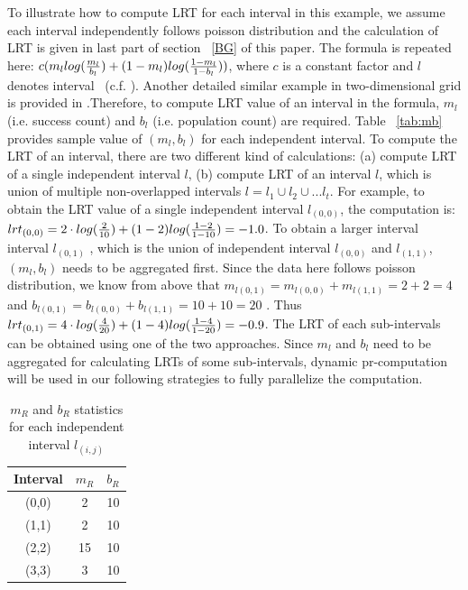 \documentclass[AMA,LATO1COL]{WileyNJD-v2}
\begin{document}
To illustrate how to compute LRT for each interval in this example, we assume each interval independently follows poisson distribution and the calculation of LRT is given in last part of section ~\ref{BG} of this paper. The formula is repeated here: $c(m_l log ({m_l\over {b_l}})+ (1-m_l)log({{1-m_l}\over {1-b_l}}))$, where $c$ is a constant factor and $l$ denotes interval ~(c.f. \cite{DagMaxmize}). Another detailed similar example in two-dimensional grid is provided in \cite{dke}.Therefore, to compute LRT value of an interval in the formula, $m_l$ (i.e. success count) and $b_l$ (i.e. population count) are required. Table ~\ref{tab:mb} provides sample value of $(m_l,b_l)$ for each independent interval. To compute the LRT of an interval, there are two different kind of calculations: (a) compute LRT of a single independent interval $l$, (b) compute LRT of an interval $l$, which is union of multiple non-overlapped intervals $l=l_1\cup l_2\cup...l_t$. For example, to obtain the LRT value of a single independent interval $l_{(0,0)}$, the computation is: $lrt_{(0,0)}=2\cdot log({2\over 10})+(1-2)log({{1-2}\over {1-10}})=-1.0$.  To obtain a larger interval interval  $l_{(0,1)}$ , which is the union of independent interval $l_{(0,0)}$ and $l_{(1,1)}$,  $(m_l, b_l)$ needs to be aggregated first. Since the data here follows poisson distribution, we know from above that $m_{l(0,1)}=m_{l(0,0)}+m_{l(1,1)}=2+2=4$ and $b_{l(0,1)}=b_{l(0,0)}+b_{l(1,1)}=10+10=20$ . Thus $lrt_{(0,1)}=4\cdot log({4\over 20})+(1-4)log({{1-4}\over {1-20}})=-0.9$. The LRT of each sub-intervals can be obtained using one of the two approaches. Since $m_l$ and $b_l$ need to be aggregated for calculating LRTs of some sub-intervals, dynamic pr-computation will be used in our following strategies to fully parallelize the computation.
\begin{table}[t]
\centering \caption{ $m_R$ and $b_R$ statistics for each independent interval $l_(i,j)$\label{tab:mb}}
     \begin{tabular}{|c|c|c|}
	\hline
    Interval  &  $m_R$ & $b_R$ \\
	\hline
    (0,0)  &  2 &  10 \\
    \hline
    (1,1)  & 2&  10 \\
    \hline
    (2,2)  &  15& 10 \\
    \hline
     (3,3) & 3  & 10  \\
    \hline
\end{tabular}
\label{lrt-compute}
\end{table}
\end{document}
